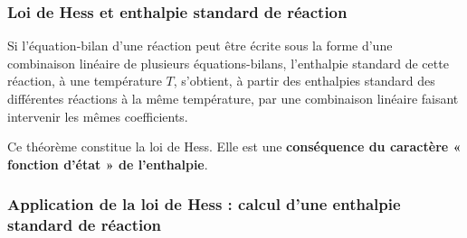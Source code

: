 \documentclass{article}
\begin{document}
\subsubsection{Loi de Hess et enthalpie standard de réaction}
\begin{enonce}
    Si l'équation-bilan d'une réaction peut être écrite sous la forme d'une combinaison linéaire de plusieurs équations-bilans, l'enthalpie standard de cette réaction, à une température $T$, s'obtient, à partir des enthalpies standard des différentes réactions à la même température, par une combinaison linéaire faisant intervenir les mêmes coefficients.
\end{enonce}
Ce théorème constitue la loi de Hess. Elle est une \textbf{conséquence du caractère « fonction d'état » de l'enthalpie}. 

\subsubsection{Application de la loi de Hess : calcul d'une enthalpie standard de réaction}
\end{document}
